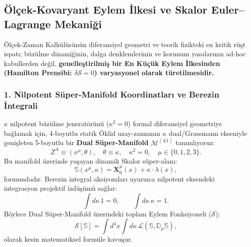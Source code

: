 \subsection{Ölçek-Kovaryant Eylem İlkesi ve Skalor Euler--Lagrange Mekaniği}
\label{sec:olcek_lagrange_ana}

Ölçek-Zaman Kalkülüsünün diferansiyel geometri ve teorik fizikteki en kritik rüşt ispatı; büzülme dinamiğinin, dalga denklemlerinin ve korunum yasalarının ad-hoc kabullerden değil, \textbf{genelleştirilmiş bir En Küçük Eylem İlkesinden (Hamilton Prensibi: $\delta \mathcal{S} = 0$) varyasyonel olarak türetilmesidir.}

\subsubsection{1. Nilpotent Süper-Manifold Koordinatları ve Berezin İntegrali}
$\kappa$ nilpotent büzülme jeneratörünü ($\kappa^2 = 0$) formal diferansiyel geometriye bağlamak için, 4-boyutlu statik Öklid uzay-zamanını $\kappa$ dual/Grassmann ekseniyle genişleten 5-boyutlu bir \textbf{Dual Süper-Manifold} $\mathcal{M}^{(4|1)}$ tanımlıyoruz:
\begin{equation}
    Z^A \equiv \left( x^\mu, \theta \right), \quad \theta \equiv \kappa, \quad \kappa^2 = 0, \quad \mu \in \{0, 1, 2, 3\}.
    \label{eq:super_koordinat}
\end{equation}
Bu manifold üzerinde yaşayan dinamik Skalor süper-alanı:
\begin{equation}
    \mathbb{S}\left(x^\mu, \kappa\right) = \mathbf{X}_0^\mu(x) + \kappa \cdot \lambda(x),
    \label{eq:skalor_super_alan}
\end{equation}
formundadır. Berezin integral aksiyomları uyarınca nilpotent eksendeki integrasyon projektif izdüşümü sağlar:
\begin{equation}
    \int d\kappa \, 1 = 0, \qquad \int d\kappa \, \kappa = 1.
    \label{eq:berezin_kurallari}
\end{equation}
Böylece Dual Süper-Manifold üzerindeki toplam Eylem Fonksiyoneli ($\mathcal{S}$):
\begin{equation}
    \mathcal{S}[\mathbb{S}] = \int d^4x \int d\kappa \, \mathcal{L}\left(\mathbb{S}, \mathbb{D}_\mu \mathbb{S}\right),
    \label{eq:skalor_eylem_fonksiyoneli}
\end{equation}
olarak kesin matematiksel formüle kavuşur.


